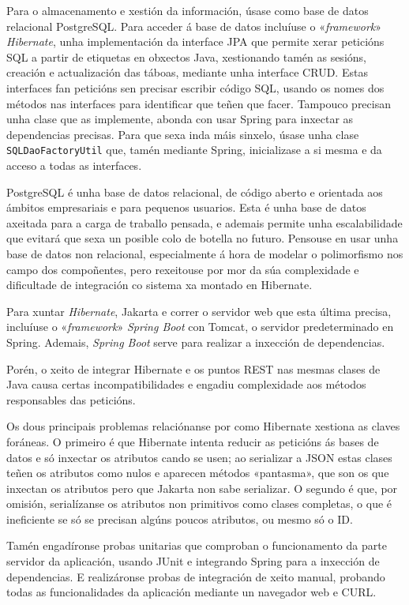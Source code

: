 Para o almacenamento e xestión da información, úsase como base de datos relacional PostgreSQL. Para acceder á base de datos incluíuse o «\textit{framework}» \textit{Hibernate}, unha implementación da interface \acrshort{JPA} que permite xerar peticións SQL a partir de etiquetas en obxectos Java, xestionando tamén as sesións, creación e actualización das táboas, mediante unha interface \acrshort{CRUD}. Estas interfaces fan peticións sen precisar escribir código SQL, usando os nomes dos métodos nas interfaces para identificar que teñen que facer. Tampouco precisan unha clase que as implemente, abonda con usar Spring para inxectar as dependencias precisas. Para que sexa inda máis sinxelo, úsase unha clase \texttt{SQLDaoFactoryUtil} que, tamén mediante Spring, inicializase a si mesma e da acceso a todas as interfaces.

PostgreSQL é unha base de datos relacional, de código aberto e orientada aos ámbitos empresariais e para pequenos usuarios.\cite{postgres} Esta é unha base de datos axeitada para a carga de traballo pensada, e ademais permite unha escalabilidade que evitará que sexa un posible colo de botella no futuro. Pensouse en usar unha base de datos non relacional, especialmente á hora de modelar o polimorfismo nos campo dos compoñentes, pero rexeitouse por mor da súa complexidade e dificultade de integración co sistema xa montado en Hibernate.

Para xuntar \textit{Hibernate}, Jakarta e correr o servidor web que esta última precisa, incluíuse o «\textit{framework}» \textit{Spring Boot} con Tomcat, o servidor predeterminado en Spring. Ademais, \textit{Spring Boot} serve para realizar a inxección de dependencias.

Porén, o xeito de integrar Hibernate e os puntos REST nas mesmas clases de Java causa certas incompatibilidades e engadiu complexidade aos métodos responsables das peticións.

Os dous principais problemas relaciónanse por como Hibernate xestiona as claves foráneas. O primeiro é que Hibernate intenta reducir as peticións ás bases de datos e só inxectar os atributos cando se usen; ao serializar a JSON estas clases teñen os atributos como nulos e aparecen métodos «pantasma», que son os que inxectan os atributos pero que Jakarta non sabe serializar. O segundo é que, por omisión, serialízanse os atributos non primitivos como clases completas, o que é ineficiente se só se precisan algúns poucos atributos, ou mesmo só o ID.

Tamén engadíronse probas unitarias que comproban o funcionamento da parte servidor da aplicación, usando JUnit e integrando Spring para a inxección de dependencias. E realizáronse probas de integración de xeito manual, probando todas as funcionalidades da aplicación mediante un navegador web e CURL.

